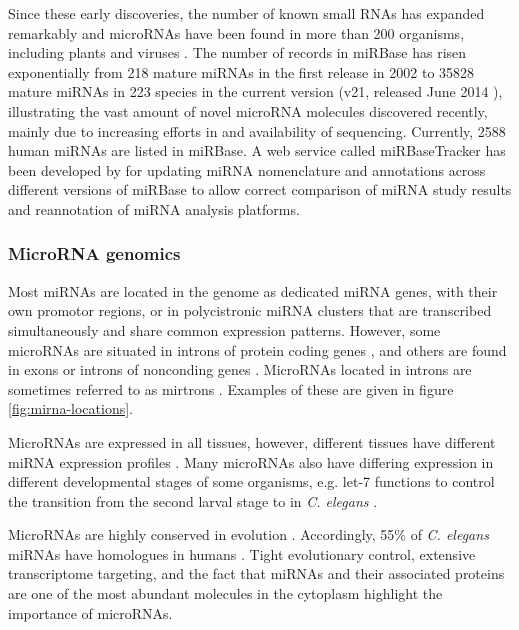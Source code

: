 Since these early discoveries, the number of known small RNAs has expanded
remarkably and microRNAs have been found in more than 200 organisms, including
plants and viruses \citep{JonesRhoades2006,Grundhoff2011}. 
The number of records in miRBase has risen exponentially
from %
218 mature miRNAs in the first release in 2002 to %
35828 mature miRNAs in 223 species in the current version (v21,
released June 2014 \citep{VanPeer2014,MiRBaseWeb}), illustrating the vast
amount of novel microRNA molecules discovered recently, mainly due to
increasing efforts in and availability of sequencing.
Currently, 2588 human miRNAs are listed in miRBase. A web service called
miRBaseTracker has been developed by \citet{VanPeer2014} for updating
miRNA nomenclature and annotations across different versions of miRBase to
allow correct comparison of miRNA study results and reannotation of miRNA
analysis platforms.



\subsubsection{MicroRNA genomics}\label{microrna-genomics}

Most miRNAs are located in the genome as dedicated miRNA genes, with their own
promotor regions, or in polycistronic miRNA clusters that are transcribed
simultaneously and share common expression patterns. However, some
microRNAs are situated in introns of protein coding genes \citep{Lin2015},
and others are found in exons or introns of nonconding genes \citep{Du2005}.
MicroRNAs located in introns are sometimes referred to as mirtrons \citep{Ruby2007}.
Examples of these are given in figure \ref{fig:mirna-locations}.

MicroRNAs are expressed in all tissues, however, different tissues
have different miRNA expression profiles \citep{Krol2010}. Many microRNAs also
have differing expression in different developmental stages
of some organisms, e.g. let-7 functions to control the transition
from the second larval stage to in \emph{C. elegans} \citep{Pasquelli2000}.

MicroRNAs are highly conserved in evolution \citep{Bartel2004}.
Accordingly, 55\% of \emph{C. elegans} miRNAs have homologues in humans
\citep{Ibanez-Ventoso2008}. Tight evolutionary control, extensive transcriptome
targeting, and the fact that miRNAs and their associated proteins are one of
the most abundant molecules in the cytoplasm \citep{Bartel2004} highlight the
importance of microRNAs.



